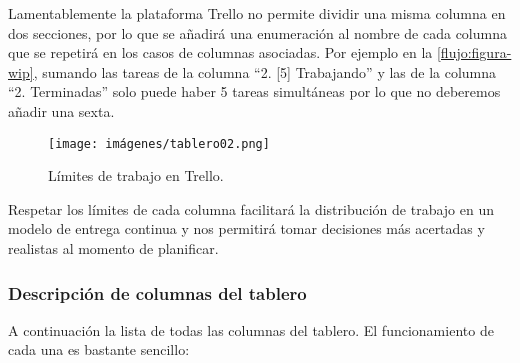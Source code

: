 Lamentablemente la plataforma Trello no permite dividir una misma columna en dos secciones, por lo que se añadirá una enumeración al nombre de cada columna que se repetirá en los casos de columnas asociadas. Por ejemplo en la \autoref{flujo:figura-wip}, sumando las tareas de la columna “2. [5] Trabajando” y las de la columna “2. Terminadas” solo puede haber 5 tareas simultáneas por lo que no deberemos añadir una sexta.

\begin{figure}[h]
	\centering
	\caption{Límites de trabajo en Trello.}
	\label{flujo:figura-wip}
	\texttt{[image: imágenes/tablero02.png]}
\end{figure}

Respetar los límites de cada columna facilitará la distribución de trabajo en un modelo de entrega continua y nos permitirá tomar decisiones más acertadas y realistas al momento de planificar.

\subsubsection{Descripción de columnas del tablero}\label{flujo:descripcion-de-columnas}
A continuación la lista de todas las columnas del tablero. El funcionamiento de cada una es bastante sencillo:

